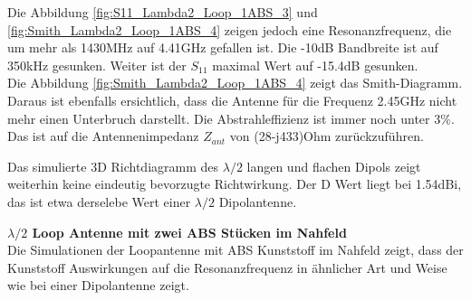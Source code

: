 Die Abbildung \ref{fig:S11_Lambda2_Loop_1ABS_3} und \ref{fig:Smith_Lambda2_Loop_1ABS_4} zeigen jedoch eine Resonanzfrequenz, die um mehr als 1430MHz auf 4.41GHz gefallen ist. Die -10dB Bandbreite ist auf 350kHz gesunken. Weiter ist der $S_{11}$ maximal Wert auf -15.4dB gesunken.\\
Die Abbildung \ref{fig:Smith_Lambda2_Loop_1ABS_4} zeigt das Smith-Diagramm. Daraus ist ebenfalls ersichtlich, dass die Antenne für die Frequenz 2.45GHz nicht mehr einen Unterbruch darstellt. Die Abstrahleffizienz ist immer noch unter $3\%$. Das ist auf die Antennenimpedanz $Z_{ant}$ von (28-j433)Ohm zurückzuführen.


Das simulierte 3D Richtdiagramm des $\lambda/2$ langen und flachen Dipols zeigt weiterhin keine eindeutig bevorzugte Richtwirkung. Der D Wert liegt bei 1.54dBi, das ist etwa derselebe Wert einer $\lambda/2$ Dipolantenne. 

\textbf{$\lambda/2$ Loop Antenne mit zwei ABS Stücken im Nahfeld}\\
Die Simulationen der Loopantenne mit ABS Kunststoff im Nahfeld zeigt, dass der Kunststoff Auswirkungen auf die Resonanzfrequenz in ähnlicher Art und Weise wie bei einer Dipolantenne zeigt.\\

